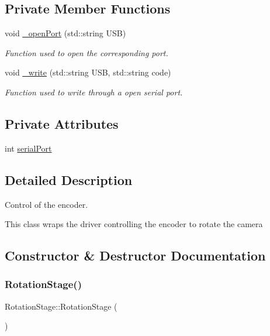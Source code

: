 \subsection*{Private Member Functions}
\begin{DoxyCompactItemize}
\item 
void \hyperlink{class_rotation_stage_a8c120bd6de719b9aee263b421850bdaf}{\+\_\+open\+Port} (std\+::string U\+SB)
\begin{DoxyCompactList}\small\item\em Function used to open the corresponding port. \end{DoxyCompactList}\item 
void \hyperlink{class_rotation_stage_afb2393a3cac78176407e8e2d31a6cef4}{\+\_\+write} (std\+::string U\+SB, std\+::string code)
\begin{DoxyCompactList}\small\item\em Function used to write through a open serial port. \end{DoxyCompactList}\end{DoxyCompactItemize}
\subsection*{Private Attributes}
\begin{DoxyCompactItemize}
\item 
int \hyperlink{class_rotation_stage_a3c76fa916da6c1804f62d61e9092ec1c}{serial\+Port}
\end{DoxyCompactItemize}


\subsection{Detailed Description}
Control of the encoder. 

This class wraps the driver controlling the encoder to rotate the camera 

\subsection{Constructor \& Destructor Documentation}
\mbox{\label{class_rotation_stage_a14ae00fd0137138b8fa3c653498d13e9}} 
\subsubsection{\texorpdfstring{Rotation\+Stage()}{RotationStage()}}
{\footnotesize\ttfamily Rotation\+Stage\+::\+Rotation\+Stage (\begin{DoxyParamCaption}{ }\end{DoxyParamCaption})\hspace{0.3cm}{\ttfamily [inline]}}



